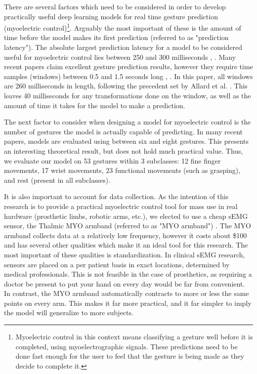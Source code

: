 \documentclass{llncs}
\begin{document}
There are several factors which need to be considered in order to develop practically useful deep learning models for real time gesture prediction (myoelectric control)\footnote{Myoelectric control in this context means classifying a gesture well before it is completed, using myoelectrographic signals. These predictions need to be done fast enough for the user to feel that the gesture is being made as they decide to complete it.}. Arguably the most important of these is the amount of time before the model makes its first prediction (referred to as "prediction latency"). 
The absolute largest prediction latency for a model to be considered useful for myoelectric control lies between 250 and 300 milliseconds  \cite{300ms}, \cite{250ms}. Many recent papers claim excellent gesture prediction results, however they require time samples (windows) between 0.5 and 1.5 seconds long \cite{rnn_1000}, \cite{rnn_128}. In this paper, all windows are 260 milliseconds in length, following the precedent set by Allard et al. \cite{primary}. This leaves 40 milliseconds for any transformations done on the window, as well as the amount of time it takes for the model to make a prediction.


The next factor to consider when designing a model for myoelectric control is the number of gestures the model is actually capable of predicting. In many recent papers, models are evaluated using between six and eight gestures. This presents an interesting theoretical result, but does not hold much practical value. Thus, we evaluate our model on 53 gestures within 3 subclasses: 12 fine finger movements, 17 wrist movements, 23 functional movements (such as grasping), and rest (present in all subclasses). 

It is also important to account for data collection. As the intention of this research is to provide a practical myoelectric control tool for mass use in real hardware (prosthetic limbs, robotic arms, etc.), we elected to use a cheap sEMG sensor, the Thalmic MYO armband (referred to as "MYO armband") \cite{myo}. The MYO armband collects data at a relatively low frequency, however it costs about \$100 and has several other qualities which make it an ideal tool for this research. The most important of these qualities is standardization. In clinical sEMG research, sensors are placed on a per patient basis in exact locations, determined by medical professionals. This is not feasible in the case of prosthetics, as requiring a doctor be present to put your hand on every day would be far from convenient. In contrast, the MYO armband automatically contracts to more or less the same points on every arm. This makes it far more practical, and it far simpler to imply the model will generalize to more subjects.
\end{document}
